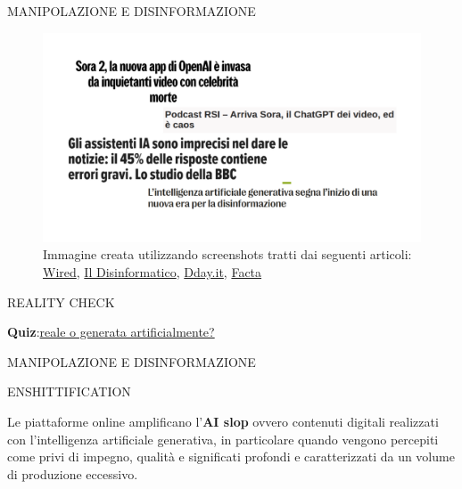 \documentclass[aspectratio=1610]{beamer}
\begin{document}
\begin{frame}{MANIPOLAZIONE E DISINFORMAZIONE}
    \begin{figure}
        \includegraphics[width=.7\linewidth]{img/disinformazione.png}
        \caption{
            Immagine creata utilizzando screenshots tratti dai seguenti articoli:
            \href{https://www.wired.it/article/sora-2-openai-video-celebrita-morte-michael-jackson-tupac-stephen-hawking/}{Wired},
            \href{https://attivissimo.me/2025/10/13/podcast-rsi-arriva-sora-il-chatgpt-dei-video-ed-e-caos/}{Il Disinformatico},
            \href{https://www.dday.it/redazione/55001/gli-assistenti-ia-sono-imprecisi-nel-dare-le-notizie-il-45-delle-risposte-contiene-errori-gravi-lo-studio-della-bbc}{Dday.it},
            \href{https://www.facta.news/articoli/lintelligenza-artificiale-generativa-disinformazione/}{Facta}
        }
    \end{figure}
    \begin{alertblock}{REALITY CHECK}
        \begin{minipage}{0.96\linewidth}
            \justifying
            \textbf{Quiz}:\textcolor{red}{\href{https://realitycheckk.com/}{reale o generata artificialmente?}}
        \end{minipage}
    \end{alertblock}
\end{frame}

\begin{frame}{MANIPOLAZIONE E DISINFORMAZIONE}
    \begin{alertblock}{ENSHITTIFICATION}
        \begin{minipage}{0.96\linewidth}
            \justifying
            Le piattaforme online amplificano l'\textbf{AI slop} ovvero contenuti digitali realizzati 
            con l'intelligenza artificiale generativa, in particolare quando vengono percepiti come 
            privi di impegno, qualità e significati profondi e caratterizzati da un volume di 
            produzione eccessivo.\\
            \bigskip
        \end{minipage}
    \end{alertblock}
\end{frame}
\end{document}
